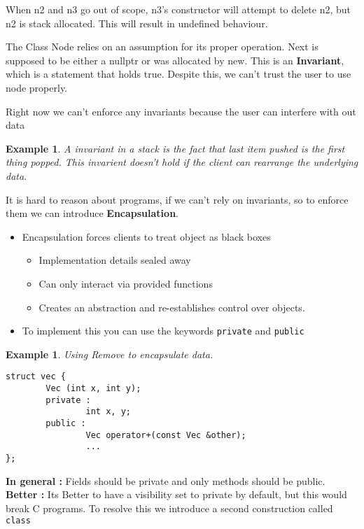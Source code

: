 \documentclass{article}
\newtheorem{ex}[theorem]{Example}
\begin{document}
When n2 and n3 go out of scope, n3's constructor will attempt to delete n2, but n2 is stack allocated. This will result in undefined behaviour. 

The Class Node relies on an assumption for its proper operation. Next is supposed to be either a nullptr or was allocated by new.  This is an \textbf{Invariant}, which is a statement that holds true. Despite this, we can't trust the user to use node properly. 

Right now we can't enforce any invariants because the user can interfere with out data 

\begin{ex} A invariant in a stack is the fact that last item pushed is the  first thing popped. This invarient doesn't hold if the client can rearrange the underlying data. 
\end{ex}

It is hard to reason about programs, if we can't rely on invariants, so to enforce them we can introduce \textbf{Encapsulation}.

\begin{itemize}
\item Encapsulation forces clients to treat object as black boxes 
\begin{itemize}
\item Implementation details sealed away 
\item Can only interact via provided functions 
\item Creates an abstraction and re-establishes control over objects. 
\end{itemize}
\item To implement this you can use the keywords \verb|private| and \verb|public|
\end{itemize}

\begin{ex} Using Remove to encapsulate data.
\begin{lstlisting}
struct vec {
		Vec (int x, int y);
		private :
				int x, y;
		public :
				Vec operator+(const Vec &other);
				...
};
\end{lstlisting}
\end{ex}

\textbf{In general : } Fields should be private and only methods should be public. \\
\textbf{Better :} Its Better to have a visibility set to private by default, but this would break C programs. To resolve this we introduce a second construction called \verb|class|
\end{document}
